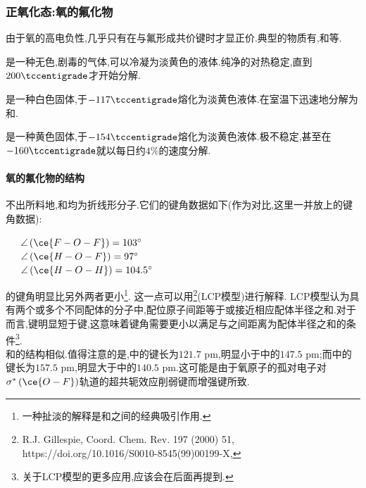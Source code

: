 \documentclass{ctexart}
\begin{document}
\subsubsection{正氧化态:氧的氟化物}
由于氧的高电负性,几乎只有在与氟形成共价键时才显正价.典型的物质有,和等.
\begin{substance}[\ce{OF2}]
    是一种无色,剧毒的气体,可以冷凝为淡黄色的液体.纯净的对热稳定,直到$200\tccentigrade$才开始分解.
\end{substance}
\begin{substance}[\ce{HOF}]
    是一种白色固体,于$-117\tccentigrade$熔化为淡黄色液体.在室温下迅速地分解为和.
\end{substance}
\begin{substance}[\ce{O2F2}]
    是一种黄色固体,于$-154\tccentigrade$熔化为淡黄色液体.极不稳定,甚至在$-160\tccentigrade$就以每日约$4\%$的速度分解.
\end{substance}
\paragraph{氧的氟化物的结构} 不出所料地,和均为折线形分子.它们的键角数据如下(作为对比,这里一并放上的键角数据):
\begin{center}
    \ \ \ $\angle\left(\ce{F-O-F}\right)=103^\circ$\\
    \ \ \ $\angle\left(\ce{H-O-F}\right)=97^\circ$\\
    \ \ \ $\angle\left(\ce{H-O-H}\right)=104.5^\circ$
\end{center}

\indent {}的键角明显比另外两者更小\footnote{一种扯淡的解释是和之间的经典吸引作用.}.%
这一点可以用\footnote{R.J. Gillespie, Coord. Chem. Rev. 197 (2000) 51, https://doi.org/10.1016/S0010-8545(99)00199-X,}(LCP模型)进行解释.%
LCP模型认为具有两个或多个不同配体的分子中,配位原子间距等于或接近相应配体半径之和.对于而言,键明显短于键,这意味着键角需要更小以满足与之间距离为配体半径之和的条件\footnote{关于LCP模型的更多应用,应该会在后面再提到.}.\\
\indent {}和的结构相似.值得注意的是,中的键长为$121.7\text{ pm}$,明显小于中的$147.5\text{ pm}$;而中的键长为$157.5\text{ pm}$,明显大于中的$140.5\text{ pm}$.这可能是由于氧原子的孤对电子对$\sigma^\ast\left(\ce{O-F}\right)$轨道的超共轭效应削弱键而增强键所致.
\end{document}

